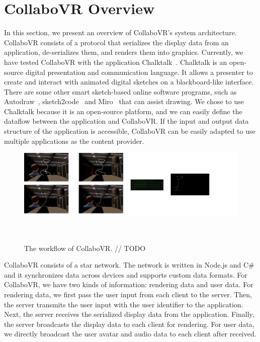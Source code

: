 \documentclass{sigchi}
\begin{document}
\section{CollaboVR Overview}
In this section, we present an overview of CollaboVR's system architecture. CollaboVR consists of a protocol that serializes the display data from an application, de-serializes them, and renders them into graphics. Currently, we have tested CollaboVR with the application Chalktalk~\cite{perlin2018chalktalk}. Chalktalk is an open-source digital presentation and communication language. It allows a presenter to create and interact with animated digital sketches on a blackboard-like interface. There are some other smart sketch-based online software programs, such as Autodraw~\cite{Autodraw}, sketch2code~\cite{Sketch2code} and Miro~\cite{Miro} that can assist drawing. We chose to use Chalktalk because it is an open-source platform, and we can easily define the dataflow between the application and CollaboVR. If the input and output data structure of the application is accessible, CollaboVR can be easily adapted to use multiple applications as the content provider.

\begin{figure}[ht!]
 \centering
 \includegraphics[width=1.75\columnwidth]{Figure2.png}
 \caption{The workflow of CollaboVR.
 // TODO
 }~\label{fig:workflow}
\end{figure}

CollaboVR consists of a star network. The network is written in Node.js and C\# and it synchronizes data across devices and supports custom data formats. For CollaboVR, we have two kinds of information: rendering data and user data. For rendering data, we first pass the user input from each client to the server. Then, the server transmits the user input with the user identifier to the application. Next, the server receives the serialized display data from the application. Finally, the server broadcasts the display data to each client for rendering. For user data, we directly broadcast the user avatar and audio data to each client after received.
\end{document}
